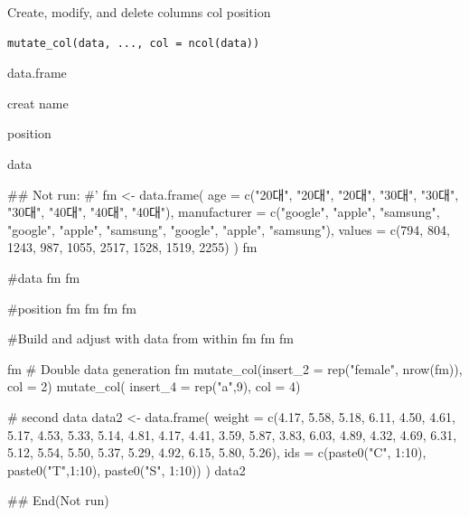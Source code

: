 \documentclass[a4paper]{book}
\begin{document}
%
\begin{Description}
Create, modify, and delete columns col position
\end{Description}
%
\begin{Usage}
\begin{verbatim}
mutate_col(data, ..., col = ncol(data))
\end{verbatim}
\end{Usage}
%
\begin{Arguments}
\begin{ldescription}
\item[\code{data}] data.frame

\item[\code{...}] creat name

\item[\code{col}] position
\end{ldescription}
\end{Arguments}
%
\begin{Value}
data
\end{Value}
%
\begin{Examples}
\begin{ExampleCode}

## Not run: 
#'
fm <- data.frame(
  age = c("20대", "20대", "20대", "30대",
  "30대", "30대", "40대", "40대", "40대"),
  manufacturer = c("google", "apple", "samsung",
  "google", "apple", "samsung", "google",
   "apple", "samsung"),
  values = c(794, 804, 1243, 987, 1055,
  2517, 1528, 1519, 2255)
)
fm

#data
fm %
fm %

#position
fm %
fm %
fm %
fm %

#Build and adjust with data from within
fm %
fm %
fm %

fm %
# Double data generation
fm %
  mutate_col(insert_2 = rep("female", nrow(fm)), col = 2) %
  mutate_col( insert_4 = rep("a",9), col = 4)


# second data
data2 <- data.frame(
  weight = c(4.17, 5.58, 5.18, 6.11, 4.50, 4.61, 5.17, 4.53, 5.33, 5.14,
             4.81, 4.17, 4.41, 3.59, 5.87, 3.83, 6.03, 4.89, 4.32, 4.69,
             6.31, 5.12, 5.54, 5.50, 5.37, 5.29, 4.92, 6.15, 5.80, 5.26),
  ids = c(paste0("C", 1:10), paste0("T",1:10), paste0("S", 1:10))
)
data2 %


## End(Not run)

\end{ExampleCode}
\end{Examples}
\end{document}
